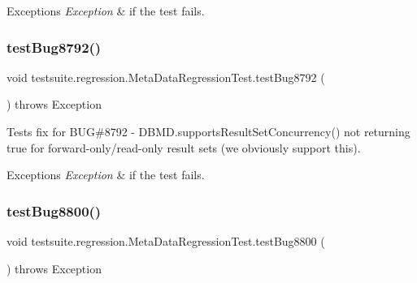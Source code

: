 \begin{DoxyExceptions}{Exceptions}
{\em Exception} & if the test fails. \\
\hline
\end{DoxyExceptions}
\mbox{\label{classtestsuite_1_1regression_1_1_meta_data_regression_test_ac05ecaf65c43b94713d2dc0ab3430a94}} 
\subsubsection{\texorpdfstring{test\+Bug8792()}{testBug8792()}}
{\footnotesize\ttfamily void testsuite.\+regression.\+Meta\+Data\+Regression\+Test.\+test\+Bug8792 (\begin{DoxyParamCaption}{ }\end{DoxyParamCaption}) throws Exception}

Tests fix for B\+UG\#8792 -\/ D\+B\+M\+D.\+supports\+Result\+Set\+Concurrency() not returning true for forward-\/only/read-\/only result sets (we obviously support this).


\begin{DoxyExceptions}{Exceptions}
{\em Exception} & if the test fails. \\
\hline
\end{DoxyExceptions}
\mbox{\label{classtestsuite_1_1regression_1_1_meta_data_regression_test_a348ef415a6528252b8b3db3a8af6e3d9}} 
\subsubsection{\texorpdfstring{test\+Bug8800()}{testBug8800()}}
{\footnotesize\ttfamily void testsuite.\+regression.\+Meta\+Data\+Regression\+Test.\+test\+Bug8800 (\begin{DoxyParamCaption}{ }\end{DoxyParamCaption}) throws Exception}

